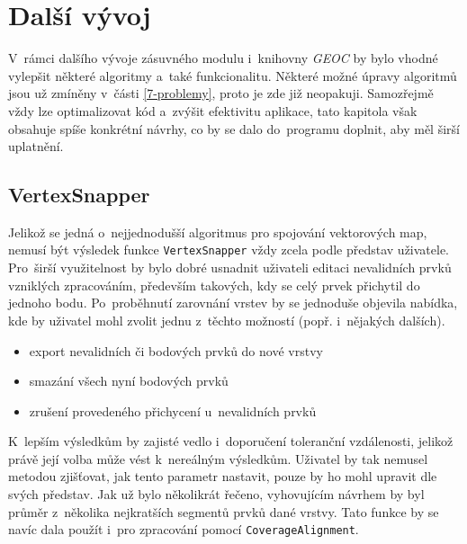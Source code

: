 \chapter{Další vývoj}
\label{9-vyvoj}

V~rámci dalšího vývoje zásuvného modulu i~knihovny \textit{GEOC}
by bylo vhodné vylepšit některé algoritmy a~také funkcionalitu.
Některé možné úpravy algoritmů jsou už zmíněny v~části 
\ref{7-problemy}, proto je zde již neopakuji. 
Samozřejmě vždy lze optimalizovat kód a~zvýšit efektivitu aplikace,
tato kapitola však obsahuje spíše konkrétní návrhy, co by se dalo 
do~programu doplnit, aby měl širší uplatnění.


\section{VertexSnapper}
\label{vs-vyvoj}

Jelikož se jedná o~nejjednodušší algoritmus pro spojování vektorových map,
nemusí být výsledek funkce \texttt{Vertex\-Snapper} vždy zcela podle
představ uživatele. Pro~širší využitelnost by bylo dobré usnadnit
uživateli editaci nevalidních prvků vzniklých zpracováním, především
takových, kdy se celý prvek přichytil do jednoho bodu. Po~proběhnutí
zarovnání vrstev by se jednoduše objevila nabídka, kde by uživatel mohl
zvolit jednu z~těchto možností (popř. i~nějakých dalších). 

\begin{itemize}
 \item export nevalidních či bodových prvků do nové vrstvy 
 \item smazání všech nyní bodových prvků
 \item zrušení provedeného přichycení u~nevalidních prvků
\end{itemize}

K~lepším výsledkům by zajisté vedlo i~doporučení toleranční vzdálenosti,
jelikož právě její volba může vést k~nereálným výsledkům. Uživatel by
tak nemusel metodou  zjišťovat, jak tento parametr 
nastavit, pouze by ho mohl upravit dle svých představ. Jak už bylo
několikrát řečeno, vyhovujícím návrhem by byl průměr z~několika
nejkratších segmentů prvků dané vrstvy. Tato funkce by se navíc dala
použít i~pro zpracování pomocí \texttt{Coverage\-Alignment}.



